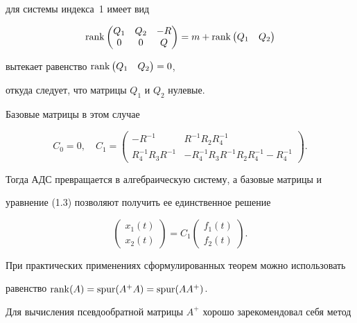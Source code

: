 для системы индекса~1 имеет вид 


$$ 


\rank\begin{pmatrix}Q_1 & Q_2 & -R \\ 0 & 0 & Q \end{pmatrix} 


=m+\rank\begin{pmatrix}Q_1 & Q_2 \end{pmatrix} 


$$ 


вытекает равенство $\operatorname{rank}\begin{pmatrix}Q_1 & Q_2\end{pmatrix}=0$, 


откуда следует, что матрицы $Q_1$ и $Q_2$ нулевые. 


 


Базовые матрицы в этом случае 


$$ 


C_0=0,\quad C_1= 


\begin{pmatrix} 


-R^{-1} & R^{-1}R_2R^{-1}_4 \\ 


R^{-1}_4R_3R^{-1} & -R^{-1}_4R_3R^{-1}R_2R^{-1}_4-R^{-1}_4 


\end{pmatrix}. 


$$ 


Тогда АДС превращается в алгебраическую систему, а базовые матрицы и 


уравнение (1.3) позволяют получить ее единственное решение 


$$ 


\begin{pmatrix}x_1(t) \\ x_2(t) \end{pmatrix}=C_1 


\begin{pmatrix}f_1(t) \\ f_2(t) \end{pmatrix}. 


$$ 


 


При практических применениях сформулированных теорем можно использовать 


равенство $\operatorname{rank}(A)=\operatorname{spur}(A^+A)=\operatorname{spur}(AA^+)$. 


Для вычисления псевдообратной матрицы $A^+$ хорошо зарекомендовал себя метод 


